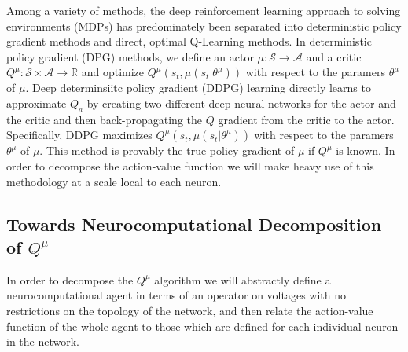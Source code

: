 \documentclass{article} %
\numberwithin{equation}{subsection}
\numberwithin{theorem}{subsection}
\theoremstyle{named}
\def\scripta{{\mathcal A}}
\def\scripts{{\mathcal S}}
\begin{document}
Among a variety of methods, the deep reinforcement learning approach to solving environments (MDPs) has predominately been separated into deterministic policy gradient methods and direct, optimal Q-Learning methods. In deterministic policy gradient (DPG) methods, we define an actor $\mu: \scripts \to \scripta$ and a critic $Q^\mu: \scripts \times \scripta \to \mathbb{R}$ and optimize $Q^\mu(s_t, \mu(s_t | \theta^{\mu}))$ with respect to the paramers $\theta^\mu$ of $\mu.$ Deep determinsiitc policy gradient (DDPG) learning directly learns to approximate $Q_a$ by creating two different deep neural networks for the actor and the critic and then back-propagating the $Q$ gradient from the critic to the actor. Specifically, DDPG maximizes $Q^\mu(s_t, \mu(s_t | \theta^{\mu}))$ with respect to the paramers $\theta^\mu$ of $\mu.$ This method is provably the true policy gradient of $\mu$ if $Q^\mu$ is known. In order to decompose the action-value function we will make heavy use of this methodology at a scale local to each neuron.

\subsection{Towards Neurocomputational Decomposition of $Q^\mu$}

In order to decompose the $Q^\mu$ algorithm we will abstractly define a neurocomputational agent in terms of an operator on voltages with no restrictions on the topology of the network, and then relate the action-value function of the whole agent to those which are defined for each individual neuron in the network.
\end{document}
